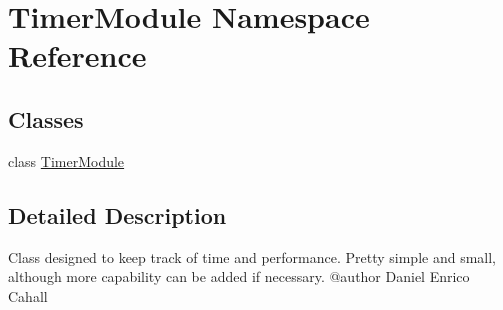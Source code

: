 \hypertarget{namespaceTimerModule}{}\section{Timer\+Module Namespace Reference}
\label{namespaceTimerModule}
\subsection*{Classes}
\begin{DoxyCompactItemize}
\item 
class \mbox{\hyperlink{classTimerModule_1_1TimerModule}{Timer\+Module}}
\end{DoxyCompactItemize}


\subsection{Detailed Description}
\begin{DoxyVerb}Class designed to keep track of time and performance. Pretty simple and small, although more capability can be added
if necessary. 
@author Daniel Enrico Cahall\end{DoxyVerb}
 